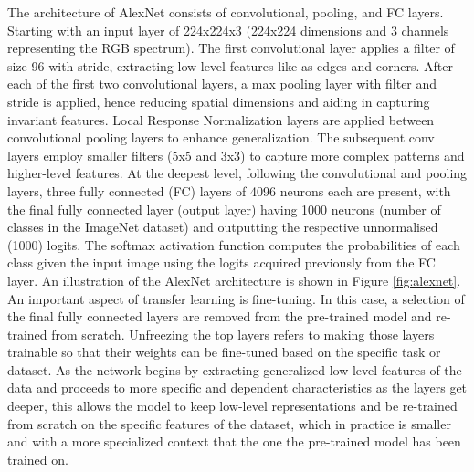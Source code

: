 \documentclass{article}
\begin{document}
    The architecture of AlexNet consists of convolutional, pooling, and FC layers. Starting with an input layer of 224x224x3 (224x224 dimensions and 3 channels representing the RGB spectrum). The first convolutional layer applies a filter of size 96 with stride, extracting low-level features like as edges and corners. After each of the first two convolutional layers, a max pooling layer with filter and stride is applied, hence reducing spatial dimensions and aiding in capturing invariant features. Local Response Normalization layers are applied between convolutional pooling layers to enhance generalization. The subsequent conv layers employ smaller filters (5x5 and 3x3) to capture more complex patterns and higher-level features. At the deepest level, following the convolutional and pooling layers, three fully connected (FC) layers of 4096 neurons each are present, with the final fully connected layer (output layer) having 1000 neurons (number of classes in the ImageNet dataset) and outputting the respective unnormalised (1000) logits. The softmax activation function computes the probabilities of each class given the input image using the logits acquired previously from the FC layer. An illustration of the AlexNet architecture is shown in Figure \ref{fig:alexnet}. \\
    	
	An important aspect of transfer learning is fine-tuning. In this case, a selection of the final fully connected layers are removed from the pre-trained model and re-trained from scratch. Unfreezing the top layers refers to making those layers trainable so that their weights can be fine-tuned based on the specific task or dataset. As the network begins by extracting generalized low-level features of the data and proceeds to more specific and dependent characteristics as the layers get deeper, this allows the model to keep low-level representations and be re-trained from scratch on the specific features of the dataset, which in practice is smaller and with a more specialized context that the one the pre-trained model has been trained on. \\
\end{document}
